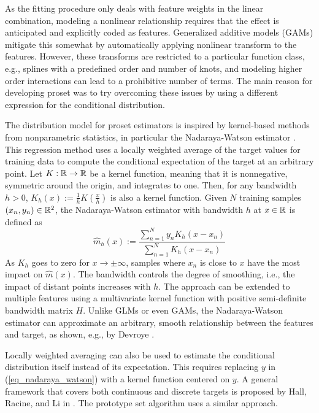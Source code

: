 As the fitting procedure only deals with feature weights in the linear combination, modeling a nonlinear relationship requires that the effect is anticipated and explicitly coded as features.
Generalized additive models (GAMs) mitigate this somewhat by automatically applying nonlinear transform to the features.
However, these transforms are restricted to a particular function class, e.g., splines with a predefined order and number of knots, and modeling higher order interactions can lead to a prohibitive number of terms.
The main reason for developing proset was to try overcoming these issues by using a different expression for the conditional distribution.\par
%
The distribution model for proset estimators is inspired by kernel-based methods from nonparametric statistics, in particular the Nadaraya-Watson estimator \cite{Nadaraya_64}\cite{Watson_64}.
This regression method uses a locally weighted average of the target values for training data to compute the conditional expectation of the target at an arbitrary point.
Let $K:\mathbb{R}\rightarrow\mathbb{R}$ be a kernel function, meaning that it is nonnegative, symmetric around the origin, and integrates to one.
Then, for any bandwidth $h>0$, $K_h(x):=\frac{1}{h}K\left(\frac{x}{h}\right)$ is also a kernel function.
Given $N$ training samples $(x_n, y_n)\in\mathbb{R}^2$, the Nadaraya-Watson estimator with bandwidth $h$ at $x\in\mathbb{R}$ is defined as
%
\begin{equation}
\hat{m}_h(x):=\frac{\sum_{n=1}^Ny_nK_h(x-x_n)}{\sum_{n=1}^NK_h(x-x_n)}\label{eq_nadaraya_watson}
\end{equation}
%
As $K_h$ goes to zero for $x\rightarrow\pm\infty$, samples where $x_n$ is close to $x$ have the most impact on $\hat{m}(x)$.
The bandwidth controls the degree of smoothing, i.e., the impact of distant points increases with $h$.
The approach can be extended to multiple features using a multivariate kernel function with positive semi-definite bandwidth matrix $H$.
Unlike GLMs or even GAMs, the Nadaraya-Watson estimator can approximate an arbitrary, smooth relationship between the features and target, as shown, e.g., by Devroye \cite{Devroye_78}.\par
%
Locally weighted averaging can also be used to estimate the conditional distribution itself instead of its expectation.
This requires replacing $y$ in (\ref{eq_nadaraya_watson}) with a kernel function centered on $y$.
A general framework that covers both continuous and discrete targets is proposed by Hall, Racine, and Li in \cite{Hall_04}.
The prototype set algorithm uses a similar approach.
